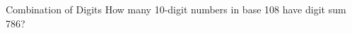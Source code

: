 \begin{problem}{Combination of Digits}
    How many 10-digit numbers in base 108 have digit sum 786?
\end{problem}
